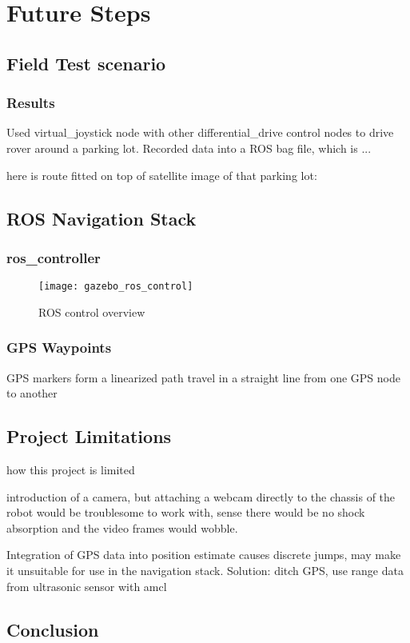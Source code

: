 \chapter{Future Steps}

\section{Field Test scenario}

\subsection{Results}

Used virtual\_joystick node with other differential\_drive control nodes to drive rover around a parking lot. Recorded data into a ROS bag file, which is ...

here is route fitted on top of satellite image of that parking lot:

\section{ROS Navigation Stack}

\subsection{ros\_controller}
\begin{figure}[h]
	\caption{ROS control overview \cite{fig_ros_control}}
	\texttt{[image: gazebo\_ros\_control]}
	\label{fig:ros_controller}
\end{figure}



\subsection{GPS Waypoints}
GPS markers form a linearized path
travel in a straight line from one GPS node to another


\section{Project Limitations}
how this project is limited

introduction of a camera, but attaching a webcam directly to the chassis of the robot would be troublesome to work with, sense there would be no shock absorption and the video frames would wobble.

Integration of GPS data into position estimate causes discrete jumps, may make it unsuitable for use in the navigation stack. Solution: ditch GPS, use range data from ultrasonic sensor with amcl


\section{Conclusion}
